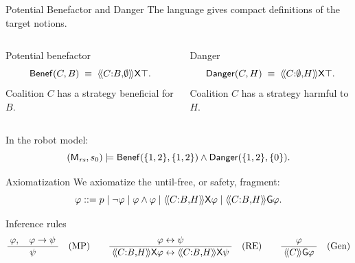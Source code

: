 \documentclass[aspectratio=169,10pt]{beamer}
\newcommand{\Benef}{\mathsf{Benef}}
\newcommand{\Danger}{\mathsf{Danger}}
\begin{document}
\begin{frame}{Potential Benefactor and Danger}
  The language gives compact definitions of the target notions.

  \vspace{0.8em}
  \begin{columns}[T,onlytextwidth]
    \begin{block}{Potential benefactor}
      \[
        \Benef(C,B)
        \;\equiv\;
        \atlbh{C}{B}{\emptyset}\X\top.
      \]
      Coalition $C$ has a strategy beneficial for $B$.
    \end{block}

    \begin{block}{Danger}
      \[
        \Danger(C,H)
        \;\equiv\;
        \atlbh{C}{\emptyset}{H}\X\top.
      \]
      Coalition $C$ has a strategy harmful to $H$.
    \end{block}
  \end{columns}

  \vspace{1em}
  In the robot model:
  \[
    (\M_{\mathit{rs}},s_0)\models
    \Benef(\{1,2\},\{1,2\}) \wedge \Danger(\{1,2\},\{0\}).
  \]
\end{frame}

\begin{frame}{Axiomatization}
  We axiomatize the until-free, or safety, fragment:
  \[
  \varphi ::= p \mid \neg\varphi \mid \varphi\wedge\varphi
  \mid \langle\!\langle C{:}B{,}H  \rangle\!\rangle\mathsf{X}\varphi
  \mid \langle\!\langle C{:}B{,}H  \rangle\!\rangle\mathsf{G}\varphi.
  \]

  \vspace{0.5em}
  \begin{block}{Inference rules}
    \[
    \frac{\;\varphi, \quad \varphi\rightarrow\psi\;}{\psi} \quad (\text{MP})
    \qquad
    \frac{\varphi\leftrightarrow\psi}{\;\langle\!\langle C{:}B{,}H  \rangle\!\rangle\mathsf{X}\varphi \leftrightarrow \langle\!\langle C{:}B{,}H  \rangle\!\rangle\mathsf{X}\psi\;}
    \quad (\text{RE})
    \qquad
    \frac{\varphi}{\;\langle\!\langle C \rangle\!\rangle\mathsf{G}\varphi\;}\quad (\text{Gen})
    \]
  \end{block}
\end{frame}
\end{document}
